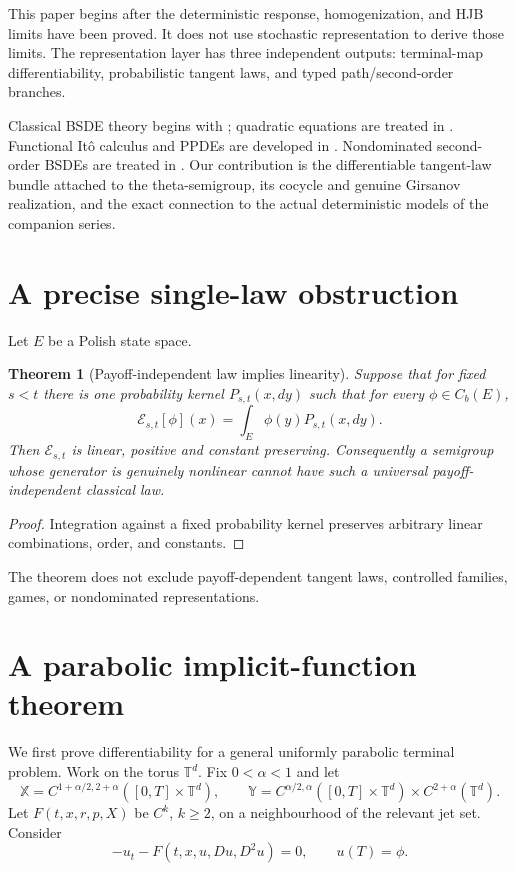 \documentclass[11pt,reqno]{amsart}
\newtheorem{theorem}{Theorem}[section]
\theoremstyle{definition}
\theoremstyle{remark}
\newcommand{\T}{\mathbb T}
\newcommand{\cE}{\mathcal E}
\begin{document}
This paper begins after the deterministic response, homogenization, and HJB
limits have been proved.  It does not use stochastic representation to derive
those limits.  The representation layer has three independent outputs:
terminal-map differentiability, probabilistic tangent laws, and typed
path/second-order branches.

Classical BSDE theory begins with \cite{PardouxPeng1990}; quadratic equations
are treated in \cite{Kobylanski2000}.  Functional It\^o calculus and PPDEs are
developed in \cite{Dupire2009,ContFournie2013,EkrenTouziZhang2014I,
EkrenTouziZhang2014II}.  Nondominated second-order BSDEs are treated in
\cite{CheriditoSonerTouziVictoir2007,SonerTouziZhang2012}.  Our contribution is
the differentiable tangent-law bundle attached to the theta-semigroup, its
cocycle and genuine Girsanov realization, and the exact connection to the
actual deterministic models of the companion series.

\section{A precise single-law obstruction}\label{sec:obstruction}

Let $E$ be a Polish state space.

\begin{theorem}[Payoff-independent law implies linearity]\label{thm:single-law}
Suppose that for fixed $s<t$ there is one probability kernel
$P_{s,t}(x,dy)$ such that for every $\phi\in C_b(E)$,
\[
 \cE_{s,t}[\phi](x)=\int_E\phi(y)P_{s,t}(x,dy).
\]
Then $\cE_{s,t}$ is linear, positive and constant preserving.  Consequently a
semigroup whose generator is genuinely nonlinear cannot have such a universal
payoff-independent classical law.
\end{theorem}

\begin{proof}
Integration against a fixed probability kernel preserves arbitrary linear
combinations, order, and constants.
\end{proof}

The theorem does not exclude payoff-dependent tangent laws, controlled
families, games, or nondominated representations.

\section{A parabolic implicit-function theorem}\label{sec:IFT}

We first prove differentiability for a general uniformly parabolic terminal
problem.  Work on the torus $\T^d$.  Fix $0<\alpha<1$ and let
\[
 \mathbb X=C^{1+\alpha/2,2+\alpha}([0,T]\times\T^d),
 \qquad
 \mathbb Y=C^{\alpha/2,\alpha}([0,T]\times\T^d)
 \times C^{2+\alpha}(\T^d).
\]
Let
$F(t,x,r,p,X)$ be $C^k$, $k\ge2$, on a neighbourhood of the relevant jet
set.  Consider
\begin{equation}\label{eq:general-PDE}
 -u_t-F(t,x,u,Du,D^2u)=0,
 \qquad u(T)=\phi.
\end{equation}
\end{document}
